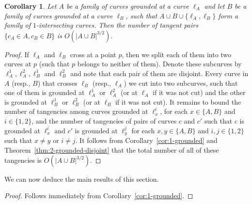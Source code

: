 \documentclass[11pt]{article}
\newtheorem{corollary}{Corollary}
\theoremstyle{definition}
\begin{document}
\begin{corollary}\label{cor:2-grounded}
	Let $A$ be a family of curves grounded at a curve $\ell_A$ and let $B$ be a family of curves grounded at a curve $\ell_B$, such that $A \cup B \cup \{\ell_A,\ell_B\}$ form a family of $1$-intersecting curves.
	Then the number of tangent pairs $\{c_A \in A, c_B \in B\}$ is $O(|A \cup B|^{3/2})$.  
\end{corollary}

\begin{proof}
	If $\ell_A$ and $\ell_B$ cross at a point $p$, then we split each of them into two curves at $p$ (such that $p$ belongs to neither of them).
	Denote these subcurves by $\ell_A^1, \ell_A^2, \ell_B^1$ and $\ell_B^2$ and note that each pair of them are disjoint.
	Every curve in $A$ (resp., $B$) that crosses $\ell_B$ (resp., $\ell_A$) we cut into two subcurves, such that one of them is grounded at $\ell_A^1$ or $\ell_A^2$ (or at $\ell_A$ if it was not cut) and the other is grounded at $\ell_B^1$ or $\ell_B^2$ (or at $\ell_B$ if it was not cut).
	It remains to bound the number of tangencies among curves grounded at $\ell_x^i$, for each $x \in \{A,B\}$ and $i \in \{1,2\}$, and the number of tangencies of pairs of curves $c$ and $c'$ such that $c$ is grounded at $\ell_x^i$ and $c'$ is grounded at $\ell_y^j$ for each $x,y \in \{A,B\}$ and $i,j \in \{1,2\}$ such that $x \ne y$ or $i \ne j$.
	It follows from Corollary~\ref{cor:1-grounded} and Theorem~\ref{thm:2-grounded-disjoint} that the total number of all of these tangencies is $O(|A \cup  B|^{3/2})$.    
\end{proof}



We can now deduce the main results of this section.
\PWOneIntThm*

\begin{proof}
	Follows immediately from Corollary~\ref{cor:1-grounded}.
\end{proof}

\OneIntThm*
\end{document}
